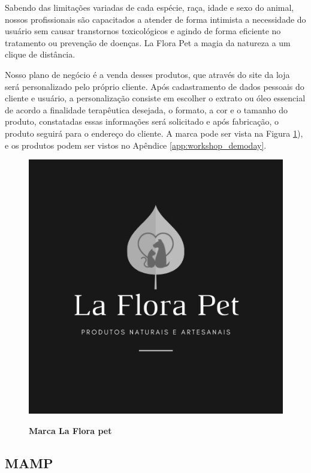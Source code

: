 Sabendo das limitações variadas de cada espécie, raça, idade e sexo do animal, nossos profissionais são capacitados a atender de forma intimista a necessidade do usuário sem causar transtornos toxicológicos e agindo de forma eficiente no tratamento ou prevenção de doenças. La Flora Pet a magia da natureza a um clique de distância.

Nosso plano de negócio é a venda desses produtos, que através do site da loja será personalizado pelo próprio cliente. Após cadastramento de dados pessoais do cliente e usuário, a personalização consiste em escolher o extrato ou óleo essencial de acordo a finalidade terapêutica desejada, o formato, a cor e o tamanho do produto, constatadas essas informações será solicitado e após fabricação, o produto seguirá para o endereço do cliente. A marca pode ser vista na Figura \ref{figura_24}), e os produtos podem ser vistos no Apêndice \ref{app:workshop_demoday}.


\begin{figure}[H]
\centering
\caption{\textbf{Marca La Flora pet}}
\includegraphics[scale=5]{Imagens/laflorapet.png}
\label{figura_24}
\end{figure}


\subsection{MAMP}

